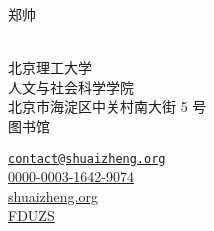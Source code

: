 \documentclass[11pt,a4paper]{article}
\makeatletter
\newcommand{\Name}{郑帅}
\newcommand{\Email}{contact@shuaizheng.org}
\newcommand{\Website}{shuaizheng.org}
\newcommand{\Github}{FDUZS}
\newcommand{\Orcid}{0000-0003-1642-9074}
\newcommand{\Affiliation}{北京理工大学\\ 人文与社会科学学院}
\newcommand{\Address}{北京市海淀区中关村南大街 5 号\\ 图书馆}
\makeatother
\begin{document}
\thispagestyle{empty} %
\begin{center}
  \kaishu
  {\fontsize{24pt}{0}\selectfont \Name \hspace{1ex}} \\[0.4cm]
  {\fontsize{16pt}{0}\selectfont \Role} \\[0.2cm]
\end{center}
\begin{minipage}[t]{0.7\textwidth}
  \kaishu
  \fontsize{12pt}{15pt}\selectfont
  \Affiliation
  \\
  \Address
\end{minipage}
\begin{minipage}[t]{0.3\textwidth}
  \kaishu
  \fontsize{12pt}{15pt}\selectfont
  \begin{flushleft}
    \faEnvelope \href{mailto:\Email}{\texttt{\Email}}
    \\
    \faOrcid \href{https://orcid.org/\Orcid}{\Orcid}
    \\
    \faGlobe \href{https://\Website}{\Website}
    \\
    \faGithub \href{https://github.com/\Github}{\Github}
  \end{flushleft}
\end{minipage}
\vspace{0.2cm}


% 



% 
% 
% 
% 
% 
% 


\end{document}
